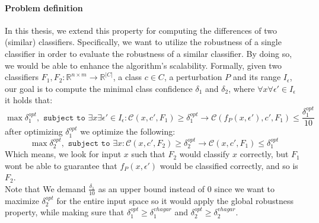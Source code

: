 \documentclass[11pt]{article}
\begin{document}
\paragraph{Problem definition} 
In this thesis, we extend this property for computing the differences of two (similar) classifiers. 
Specifically, we want to utilize the robustness of a single classifier in order to evaluate the robustness of a similar classifier. By doing so, we would be able to enhance the algorithm's scalability.
Formally, given two classifiers $F_1,F_2: \mathbb{R}^{n \times m} \rightarrow {\mathbb{R}}^{|C|}$, a class $c\in{C}$, a perturbation $P$ and its range $I_\epsilon$, our goal is to compute the minimal class confidence $\delta_1$ and $\delta_2$, where $\forall{x}\forall{\epsilon'}\in{I_{\epsilon}}$ it holds that:
$$\max{\delta_1^{opt}}, \texttt{ subject to } \exists{x}\exists{\epsilon'}\in{I_\epsilon}: \mathcal{C}(x,c',F_1) \geq \delta_1^{opt} \rightarrow \mathcal{C}(f_P(x,\epsilon'),c',F_1)\leq \frac{\delta_1^{opt}}{10} $$
after optimizing $\delta_1^{opt}$ we optimize the following:
$$\max{\delta_2^{opt}}, \texttt{ subject to }  \exists{x}:  \mathcal{C}(x,c',F_2) \geq \delta_2^{opt} \rightarrow \mathcal{C}(x,c',F_1)\leq \delta_1^{opt}$$
Which means, we look for input $x$ such that $F_2$ would classify $x$ correctly, but $F_1$ wont be able to guarantee that $f_P(x,\epsilon')$ would be classified correctly, and so is $F_2$. 
\\
Note that We demand $\frac{\delta_1}{10}$ as an upper bound instead of $0$ since we want to maximize $\delta_2^{opt}$ for the entire input space so it would apply the global robustness property, while making sure that $\delta_1^{opt} \geq \delta^{vhagar}_1$ and $\delta_2^{opt} \geq \delta^{vhagar}_2$.
\end{document}
